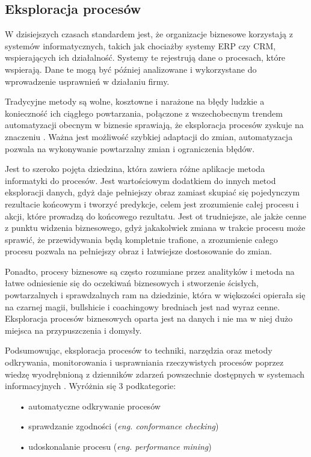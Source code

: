 \subsection{Eksploracja procesów}

W dzisiejszych czasach standardem jest, że organizacje biznesowe korzystają z systemów informatycznych, takich jak chociażby systemy ERP czy CRM, wspierających ich działalność. Systemy te rejestrują dane o procesach, które wspierają. Dane te mogą być później analizowane i wykorzystane do wprowadzenie usprawnień w działaniu firmy.   

Tradycyjne metody są wolne, kosztowne i narażone na błędy ludzkie a konieczność ich ciągłego powtarzania, połączone z wszechobecnym trendem automatyzacji obecnym w biznesie sprawiają, że eksploracja procesów zyskuje na znaczeniu \cite{market-pm}. Ważna jest możliwość szybkiej adaptacji do zmian, automatyzacja pozwala na wykonywanie powtarzalny zmian i ograniczenia błędów.

Jest to szeroko pojęta dziedzina, która zawiera różne aplikacje metoda informatyki do procesów. 
Jest wartościowym dodatkiem do innych metod eksploracji danych, gdyż daje pełniejszy obraz zamiast skupiać się pojedynczym rezultacie końcowym i tworzyć predykcje, celem jest zrozumienie całej procesu i akcji, które prowadzą do końcowego rezultatu. Jest ot trudniejsze, ale jakże cenne z punktu widzenia biznesowego, gdyż jakakolwiek zmiana w trakcie procesu może sprawić, że przewidywania będą kompletnie trafione, a zrozumienie całego procesu pozwala na pełniejszy obraz i łatwiejsze dostosowanie do zmian. 

Ponadto, procesy biznesowe są często rozumiane przez analityków i metoda na łatwe odniesienie się do oczekiwań biznesowych i stworzenie ścisłych, powtarzalnych i sprawdzalnych ram na dziedzinie, która w większości opierała się na czarnej magii, bullshicie i coachingowy bredniach jest nad wyraz cenne. Eksploracja procesów biznesowych oparta jest na danych i nie ma w niej dużo miejsca na przypuszczenia i domysły.

Podsumowując, eksploracja procesów to techniki, narzędzia oraz metody odkrywania, monitorowania i usprawniania rzeczywistych procesów poprzez wiedzę wyodrębnioną z dzienników zdarzeń powszechnie dostępnych w systemach informacyjnych \cite{pm-manifesto}\cite{mining-overview}.
Wyróżnia się 3 podkategorie: 
\begin{itemize}
  \item[•] automatyczne odkrywanie procesów
  \item[•] sprawdzanie zgodności (\textit{eng. conformance checking})
  \item[•] udoskonalanie procesu (\textit{eng. performance mining})
\end{itemize}


